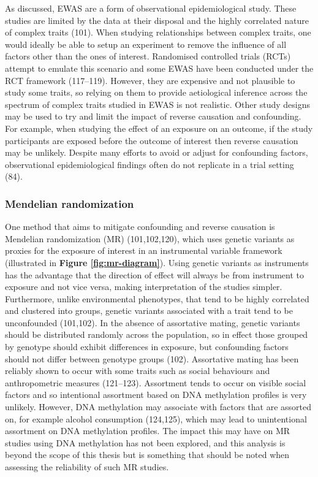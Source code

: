 \documentclass[11pt,twoside]{bristolthesis}
\begin{document}
As discussed, EWAS are a form of observational epidemiological study. These studies are limited by the data at their disposal and the highly correlated nature of complex traits (101). When studying relationships between complex traits, one would ideally be able to setup an experiment to remove the influence of all factors other than the ones of interest. Randomised controlled trials (RCTs) attempt to emulate this scenario and some EWAS have been conducted under the RCT framework (117--119). However, they are expensive and not plausible to study some traits, so relying on them to provide aetiological inference across the spectrum of complex traits studied in EWAS is not realistic. Other study designs may be used to try and limit the impact of reverse causation and confounding. For example, when studying the effect of an exposure on an outcome, if the study participants are exposed before the outcome of interest then reverse causation may be unlikely. Despite many efforts to avoid or adjust for confounding factors, observational epidemiological findings often do not replicate in a trial setting (84).

\hypertarget{mr-01}{%
\subsubsection{Mendelian randomization}\label{mr-01}}

One method that aims to mitigate confounding and reverse causation is Mendelian randomization (MR) (101,102,120), which uses genetic variants as proxies for the exposure of interest in an instrumental variable framework (illustrated in \textbf{Figure \ref{fig:mr-diagram}}). Using genetic variants as instruments has the advantage that the direction of effect will always be from instrument to exposure and not vice versa, making interpretation of the studies simpler. Furthermore, unlike environmental phenotypes, that tend to be highly correlated and clustered into groups, genetic variants associated with a trait tend to be unconfounded (101,102). In the absence of assortative mating, genetic variants should be distributed randomly across the population, so in effect those grouped by genotype should exhibit differences in exposure, but confounding factors should not differ between genotype groups (102). Assortative mating has been reliably shown to occur with some traits such as social behaviours and anthropometric measures (121--123). Assortment tends to occur on visible social factors and so intentional assortment based on DNA methylation profiles is very unlikely. However, DNA methylation may associate with factors that are assorted on, for example alcohol consumption (124,125), which may lead to unintentional assortment on DNA methylation profiles. The impact this may have on MR studies using DNA methylation has not been explored, and this analysis is beyond the scope of this thesis but is something that should be noted when assessing the reliability of such MR studies.
\end{document}
